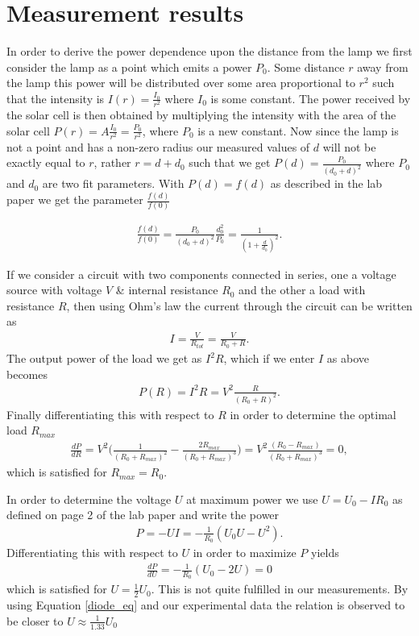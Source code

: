 \documentclass[a4paper]{article}
\begin{document}
\section{Measurement results}

In order to derive the power dependence upon the distance from the lamp we first consider the lamp as a point which emits a power $P_0$. Some distance $r$ away from the lamp this power will be distributed over some area proportional to $r^2$ such that the intensity is $I(r) = \frac{I_0}{r^2}$ where $I_0$ is some constant. The power received by the solar cell is then obtained by multiplying the intensity with the area of the solar cell $P(r) = A \frac{I_0}{r^2} = \frac{P_0}{r^2}$, where $P_0$ is a new constant. Now since the lamp is not a point and has a non-zero radius our measured values of $d$ will not be exactly equal to $r$, rather $r = d + d_0$ such that we get $P(d) = \frac{P_0}{(d_0 + d)^2}$ where $P_0$ and $d_0$ are two fit parameters. With $P(d) = f(d)$ as described in the lab paper we get the parameter $\frac{f(d)}{f(0)}$

\begin{align}\label{eq}
	\frac{f(d)}{f(0)} = \frac{P_0}{(d_0 + d)^2} \frac{d_0^2}{P_0} = \frac{1}{(1 + \frac{d}{d_0})^2}.
\end{align}


If we consider a circuit with two components connected in series, one a voltage source with voltage $V$ \& internal resistance $R_0$ and the other a load with resistance $R$, then using Ohm's law the current through the circuit can be written as 
\begin{align}
	I = \frac{V}{R_{tot}} = \frac{V}{R_0 + R}.
\end{align}
The output power of the load we get as $I^2 R$, which if we enter $I$ as above becomes
\begin{align}
	P(R) = I^2 R = V^2 \frac{R}{(R_0 + R)^2}.
\end{align}
Finally differentiating this with respect to $R$ in order to determine the optimal load $R_{max}$
\begin{align}
	\frac{dP}{dR} = V^2 \Big ( \frac{1}{(R_0 + R_{max})^2} - \frac{2 R_{max}}{(R_0 + R_{max})^3} \Big ) = V^2 \frac{(R_0 - R_{max})}{(R_0 + R_{max})^3} = 0,
\end{align}
which is satisfied for $R_{max} = R_0$.

In order to determine the voltage $U$ at maximum power we use $U = U_0 - I R_0$ as defined on page 2 of the lab paper and write the power
\begin{align}
	P = -UI = -\frac{1}{R_0}(U_0U - U^2).
\end{align}
Differentiating this with respect to $U$ in order to maximize $P$ yields
\begin{align}
	\frac{dP}{dU} = -\frac{1}{R_0}(U_0 - 2U) = 0
\end{align}
which is satisfied for $U = \frac{1}{2}U_0$. This is not quite fulfilled in our measurements. By using Equation \ref{diode_eq} and our experimental data the relation is observed to be closer to $U \approx \frac{1}{1.33}U_0$
\end{document}
